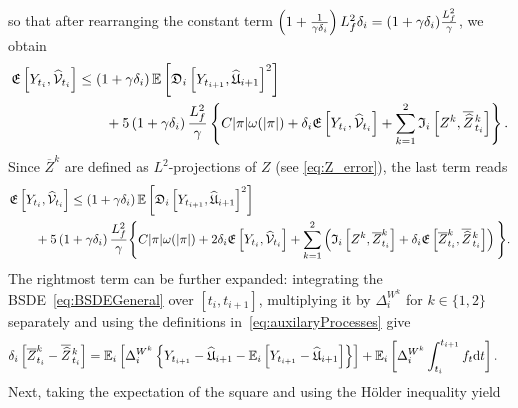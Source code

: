 so that after rearranging the constant term $\left(1+\frac{1}{\gamma\delta_{i}}\right)L_f^2\delta_{i}=(1+\gamma\delta_{i})\frac{L_f^2}\gamma$,
we obtain
\begin{equation}
\begin{aligned}
\mathfrak{E}\left[Y_{t_i}, \widehat{\mathcal{V}}_{t_i}\right] &\leq \left(1+\gamma \delta_{i} \right) \mathbb{E}\left[\mathfrak{D}_i\left[Y_{t_{i+1}}, \widehat{\mathfrak{U}}_{i+1}\right]^{2}\right] \\
 & \qquad + 5\left(1+\gamma \delta_{i} \right) \frac{L_f^2}{\gamma}\left\{
C |\pi| \omega(|\pi|) + \delta_{i}  \mathfrak{E}\left[Y_{t_i}, \widehat{\mathcal{V}}_{t_i}\right]
+ \sum_{k=1}^{2}\mathfrak{I}_i\left[Z^k, \overline{\widehat{Z}}\kern0.1em^{k}_{t_i}\right]\right\}.
\end{aligned}
\end{equation}
Since $\overline{Z}^k$ are defined as $L^2$-projections of $Z$ (see \eqref{eq:Z_error}), the last term reads
\begin{align}\label{eq:convergence_part1}
\begin{split}
& \mathfrak{E}\left[Y_{t_i}, \widehat{\mathcal{V}}_{t_i}\right] \leq\left(1+\gamma \delta_{i} \right) \mathbb{E}\left[\mathfrak{D}_i\left[Y_{t_{i+1}}, \widehat{\mathfrak{U}}_{i+1}\right]^2\right] \\
 & \qquad + 5\left(1+\gamma \delta_{i} \right) \frac{L_f^2}{\gamma}\Bigg\{C |\pi| \omega(|\pi|) + 2 \delta_{i}  \mathfrak{E}\left[Y_{t_i}, \widehat{\mathcal{V}}_{t_i}\right] 
+ \sum_{k=1}^2\left(\mathfrak{I}_i\left[Z^k, \overline{Z}^{k}_{t_i}\right] + \delta_{i} \mathfrak{E}\left[\overline{Z}^k_{t_i}, \overline{\widehat{Z}}\kern0.1em^{k}_{t_i}\right] \right)\Bigg\}.
\end{split}
\end{align}
The rightmost term can be further expanded:
integrating the BSDE~\eqref{eq:BSDEGeneral} over $[t_i, t_{i+1}]$, multiplying it by $\Delta^{W^k}_{i}$ for $k\in\{1,2\}$ separately and using the definitions in~\eqref{eq:auxilaryProcesses} give
\begin{align}
\delta_{i} \left[\overline{Z}^k_{t_i}-\overline{\widehat{Z}}\kern0.1em^{k}_{t_{i}}\right] &= \mathbb{E}_i\left[\Delta^{W^k}_{i}\left\{Y_{t_{i+1}}-\widehat{\mathfrak{U}}_{i+1}-\mathbb{E}_i\left[Y_{t_{i+1}}-\widehat{\mathfrak{U}}_{i+1}\right]\right\}\right] 
+ \mathbb{E}_i\left[\Delta^{W^k}_{i} \int_{t_i}^{t_{i+1}} f_{t}\mathrm{d} t\right].
\end{align}
Next, taking the expectation of the square and using the H{\"o}lder inequality yield
